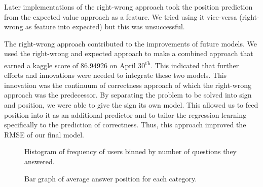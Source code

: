 \documentclass[letterpaper]{article}
\begin{document}
Later implementations of the right-wrong approach took the position prediction from the expected value approach as a feature. We tried using it vice-versa (right-wrong as feature into expected) but this was unsuccessful.

The right-wrong approach contributed to the improvements of future models. We used the right-wrong and expected approach to make a combined approach that earned a kaggle score of 86.94926 on April 30\textsuperscript{th}. This indicated that further efforts and innovations were needed to integrate these two models. This innovation was the continuum of correctness approach of which the right-wrong approach was the predecessor. By separating the problem to be solved into sign and position, we were able to give the sign its own model. This allowed us to feed position into it as an additional predictor and to tailor the regression learning specifically to the prediction of correctness. Thus, this approach improved the RMSE of our final model.



\begin{figure}[H]
	\begin{center}
	\end{center}
	\caption{Histogram of frequency of users binned by number of questions they answered.}
	\label{fig:userHisto}
\end{figure}

\begin{figure}[H]
	\begin{center}
	\end{center}
	\caption{Bar graph of average answer position for each category.}
	\label{fig:categoryAverages}
\end{figure}
\end{document}
